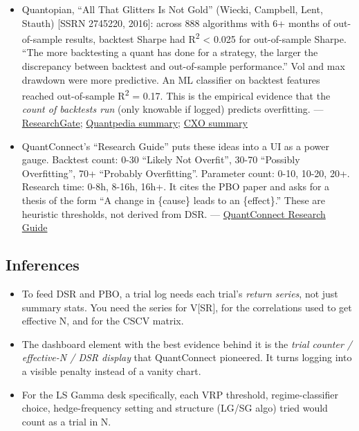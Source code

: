 \documentclass{article}
\begin{document}
\begin{itemize}
\item Quantopian, ``All That Glitters Is Not Gold'' (Wiecki, Campbell, Lent, Stauth) [SSRN 2745220, 2016]: across 888 algorithms with 6+ months of out-of-sample results, backtest Sharpe had R\textsuperscript{2} < 0.025 for out-of-sample Sharpe. ``The more backtesting a quant has done for a strategy, the larger the discrepancy between backtest and out-of-sample performance.'' Vol and max drawdown were more predictive. An ML classifier on backtest features reached out-of-sample R\textsuperscript{2} = 0.17. This is the empirical evidence that the \emph{count of backtests run} (only knowable if logged) predicts overfitting. --- \href{https://www.researchgate.net/publication/307553701_All_That_Glitters_Is_Not_Gold_Comparing_Backtest_and_Out-of-Sample_Performance_on_a_Large_Cohort_of_Trading_Algorithms}{ResearchGate}; \href{https://quantpedia.com/quantopians-academic-paper-about-in-vs-out-of-sample-performance-of-trading-alg/}{Quantpedia summary}; \href{https://www.cxoadvisory.com/big-ideas/in-sample-vs-out-of-sample-performance-of-888-trading-strategies/}{CXO summary}

\item QuantConnect's ``Research Guide'' puts these ideas into a UI as a power gauge. Backtest count: 0-30 ``Likely Not Overfit'', 30-70 ``Possibly Overfitting'', 70+ ``Probably Overfitting''. Parameter count: 0-10, 10-20, 20+. Research time: 0-8h, 8-16h, 16h+. It cites the PBO paper and asks for a thesis of the form ``A change in \{cause\} leads to an \{effect\}.'' These are heuristic thresholds, not derived from DSR. --- \href{https://www.quantconnect.com/docs/v2/cloud-platform/backtesting/research-guide}{QuantConnect Research Guide}

\end{itemize}

\subsection{Inferences}

\begin{itemize}

\item To feed DSR and PBO, a trial log needs each trial's \emph{return series}, not just summary stats. You need the series for V[SR], for the correlations used to get effective N, and for the CSCV matrix.

\item The dashboard element with the best evidence behind it is the \emph{trial counter /\allowbreak{} effective-N /\allowbreak{} DSR display} that QuantConnect pioneered. It turns logging into a visible penalty instead of a vanity chart.

\item For the LS Gamma desk specifically, each VRP threshold, regime-classifier choice, hedge-frequency setting and structure (LG/\allowbreak{}SG algo) tried would count as a trial in N.

\end{itemize}
\end{document}
